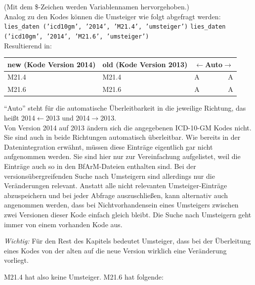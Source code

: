 (Mit dem \$-Zeichen werden Variablennamen hervorgehoben.) \\

Analog zu den Kodes können die Umsteiger wie folgt abgefragt werden: \newline
\texttt{lies\_daten ('icd10gm', '2014', 'M21.4', 'umsteiger')} \newline
\texttt{lies\_daten ('icd10gm', '2014', 'M21.6', 'umsteiger')} \\

Resultierend in:

\begin{centernss}
\renewcommand{\arraystretch}{1.2}
\begin{tabular}{p{136pt}p{136pt}lr}
new (Kode Version 2014) & old (Kode Version 2013) & \multicolumn{2}{c}{$\leftarrow$Auto$\rightarrow$} \\
\hline
M21.4 & M21.4 & A & A \\
M21.6 & M21.6 & A & A \\
\end{tabular}
\end{centernss}

``Auto'' steht für die automatische Überleitbarkeit in die jeweilige Richtung, das heißt 2014$\leftarrow$2013 und 2014$\rightarrow$2013. \\

Von Version 2014 auf 2013 ändern sich die angegebenen ICD-10-GM Kodes nicht. Sie sind auch in beide Richtungen automatisch überleitbar. Wie bereits in der Datenintegration erwähnt, müssen diese Einträge eigentlich gar nicht aufgenommen werden. Sie sind hier nur zur Vereinfachung aufgelistet, weil die Einträge auch so in den BfArM-Dateien enthalten sind. Bei der versionsübergreifenden Suche nach Umsteigern sind allerdings nur die Veränderungen relevant. Anstatt alle nicht relevanten Umsteiger-Einträge abzuspeichern und bei jeder Abfrage auszuschließen, kann alternativ auch angenommen werden, dass bei Nichtvorhandensein eines Umsteigers zwischen zwei Versionen dieser Kode einfach gleich bleibt. Die Suche nach Umsteigern geht immer von einem vorhanden Kode aus.

\emph{Wichtig:} Für den Rest des Kapitels bedeutet Umsteiger, dass bei der Überleitung eines Kodes von der alten auf die neue Version wirklich eine Veränderung vorliegt. 

\newpage

M21.4 hat also keine Umsteiger. M21.6 hat folgende: \newline

